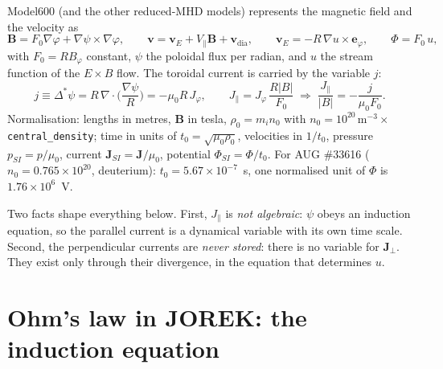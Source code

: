 \documentclass[11pt,a4paper]{article}
\newcommand{\bB}{\mathbf{B}}
\newcommand{\bJ}{\mathbf{J}}
\newcommand{\bv}{\mathbf{v}}
\newcommand{\ephi}{\mathbf{e}_\varphi}
\newcommand{\divg}{\nabla\!\cdot\!}
\newcommand{\Jpar}{J_\parallel}
\newcommand{\code}[1]{\texttt{#1}}
\newcommand{\vE}{\mathbf{v}_E}
\begin{document}
Model600 (and the other reduced-MHD models) represents the magnetic field and the velocity as
\begin{equation}
  \bB = F_0\nabla\varphi + \nabla\psi\times\nabla\varphi,\qquad
  \bv = \vE + V_\parallel\bB + \bv_{\mathrm{dia}},\qquad
  \vE = -R\,\nabla u\times\ephi,\qquad \Phi = F_0\,u ,
  \label{eq:jorekfields}
\end{equation}
with $F_0 = R B_\varphi$ constant, $\psi$ the poloidal flux per radian, and $u$ the stream function of the
$E\times B$ flow. The toroidal current is carried by the variable $j$:
\begin{equation}
  j \equiv \Delta^*\psi = R\,\divg\Big(\frac{\nabla\psi}{R}\Big) = -\mu_0 R\,J_\varphi ,
  \qquad
  \Jpar = J_\varphi\,\frac{R|B|}{F_0}\;\Rightarrow\; \frac{\Jpar}{|B|} = -\frac{j}{\mu_0 F_0} .
  \label{eq:jorekj}
\end{equation}
Normalisation: lengths in metres, $\bB$ in tesla, $\rho_0 = m_i n_0$ with $n_0 = 10^{20}\,\mathrm{m^{-3}}\times$
\code{central\_density}; time in units of $t_0 = \sqrt{\mu_0\rho_0}$, velocities in $1/t_0$, pressure $p_{SI} = p/\mu_0$,
current $\bJ_{SI} = \bJ/\mu_0$, potential $\Phi_{SI} = \Phi/t_0$. For AUG \#33616 ($n_0 = 0.765\times10^{20}$,
deuterium): $t_0 = 5.67\times10^{-7}$~s, one normalised unit of $\Phi$ is $1.76\times10^{6}$~V.

Two facts shape everything below. First, $\Jpar$ is \emph{not algebraic}: $\psi$ obeys an induction equation, so the
parallel current is a dynamical variable with its own time scale. Second, the perpendicular currents are \emph{never
stored}: there is no variable for $\bJ_\perp$. They exist only through their divergence, in the equation that
determines $u$.

\section{Ohm's law in JOREK: the induction equation}
\end{document}
